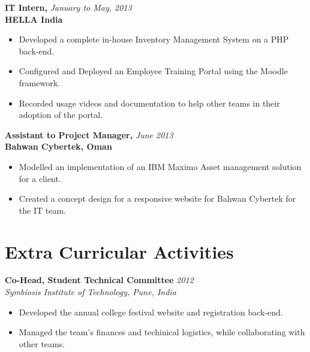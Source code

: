 \documentclass[overlapped]{res}
\begin{document}
\begin{resume}
  \textbf{IT Intern,} \hfill \textit{January to May, 2013}\\
  \textbf{HELLA India}
  \begin{itemize}
  \item Developed a complete in-house Inventory Management System on a PHP
    back-end. 
  \item Configured and Deployed an Employee Training Portal using the
    Moodle framework.
  \item Recorded usage videos and documentation to help other teams in their
    adoption of the portal.
  \end{itemize}
  
  \textbf{Assistant to Project Manager,}  \hfill \textit{June 2013}\\
  \textbf{Bahwan Cybertek, Oman}
  \begin{itemize}
  \item Modelled an implementation of an IBM Maximo Asset management 
    solution for a client. 
  \item Created a concept design for a responsive website for Bahwan Cybertek 
    for the IT team. 
  \end{itemize}

  \section{Extra Curricular Activities}  

  \textbf{Co-Head, Student Technical Committee}   \hfill \textit{2012} \\
  \textit{Symbiosis Institute of Technology, Pune, India}
  \begin{itemize}
  \item Developed the annual college festival website and registration back-end.
  \item Managed the team's finances and techinical logistics, while collaborating 
    with other teams.
  \end{itemize}


\end{resume}
\end{document}
